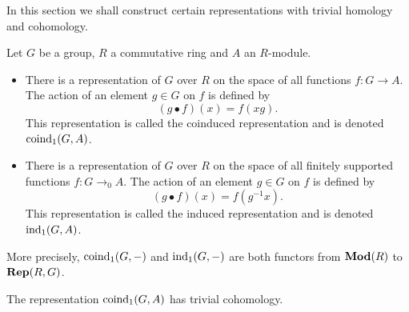 In this section we shall construct certain representations with trivial homology and cohomology.

\begin{definition}\label{def:induced}
	\leanok
	Let $G$ be a group, $R$ a commutative ring and $A$ an $R$-module.
	\begin{itemize}
		\item
		There is a representation of $G$ over $R$
		on the space of all functions $f : G \to A$. The action of an element $g \in G$ on $f$
		is defined by
		\[
			(g \bullet f) (x) = f(xg).
		\]
		This representation is called the coinduced representation and is denoted $\mathrm{coind}_1(G,A)$.
		\item
		There is a representation of $G$ over $R$
		on the space of all finitely supported functions $f : G \to_0 A$.
		The action of an element $g \in G$ on $f$ is defined by
		\[
			(g \bullet f) (x) = f(g^{-1}x).
		\]
		This representation is called the induced representation and is denoted $\mathrm{ind}_1(G,A)$.
	\end{itemize}
	More precisely, $\mathrm{coind}_1(G,-)$ and $\mathrm{ind}_1(G,-)$ are both functors from $\mathbf{Mod}(R)$ to $\mathbf{Rep}(R,G)$.
\end{definition}

\begin{lemma}	\label{lem:coind₁ trivial cohomology}
	\leanok
	The representation $\mathrm{coind}_1(G,A)$ has trivial cohomology.
\end{lemma}

